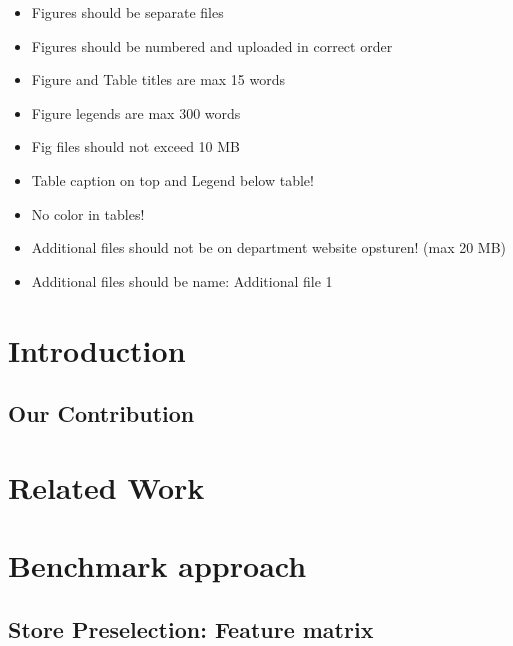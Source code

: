 \documentclass[twocolumn]{bmcart}%
\begin{document}
\begin{itemize}
	\item Figures should be separate files
	\item Figures should be numbered and uploaded in correct order
	\item Figure and Table titles are max 15 words
	\item Figure legends are max 300 words
	\item Fig files should not exceed 10 MB
	\item Table caption on top and Legend below table!
	\item No color in tables!
	\item Additional files should not be on department website opsturen! (max 20 MB)
	\item Additional files should be name: Additional file 1
\end{itemize}

\section{Introduction}


%

\subsection{Our Contribution}


\section{Related Work}



\section{Benchmark approach}


\subsection{Store Preselection: Feature matrix}
\label{subsec:featurematrix}

\end{document}

